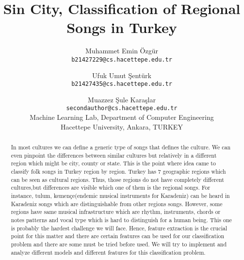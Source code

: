 \documentclass[10pt,twocolumn,letterpaper]{article}
\begin{document}
\title{Sin City, Classification of Regional Songs in Turkey}

\author{Muhammet Emin Özgür\\
{\tt\small b21427229@cs.hacettepe.edu.tr}
\and
Ufuk Umut Şentürk\\
{\tt\small b21427435@cs.hacettepe.edu.tr} \\
\and
Muazzez Şule Karaşlar\\
{\tt\small secondauthor@cs.hacettepe.edu.tr}\\
{Machine Learning Lab, Department of Computer Engineering}\\
{Hacettepe University, Ankara, TURKEY}\\
}

\maketitle
\begin{abstract}
  In most cultures we can define a generic type of songs that defines the culture. We can even pinpoint the differences between similar cultures but relatively in a different region which might be city, county or state. This is the point where idea came to classify folk songs in Turkey region by region. Turkey has 7 geographic regions which can be seen as cultural regions. Thus, those regions do not have completely different cultures,but differences are visible which one of them is the regional songs. For instance, tulum, kemençe(endemic musical instruments for Karadeniz) can be heard in Karadeniz songs which are distinguishable from other regions songs. However, some regions have same musical infrastructure which are rhythm, instruments, chords or notes patterns and vocal type which is hard to distinguish for a human being. This one is probably the hardest challenge we will face. Hence, feature extraction is the crucial point for this matter and there are certain features can be used for our classification problem and there are some must be tried before used. We will try to implement and analyze different models and different features for this classification problem.
\end{abstract}
\end{document}
